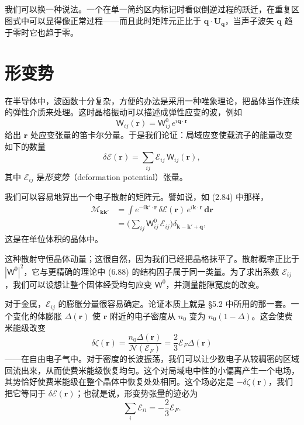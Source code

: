 我们可以换一种说法。一个在单一简约区内标记时看似倒逆过程的跃迁，在重复区图式中可以显得像正常过程——而且此时矩阵元正比于 $\mathbf{q}\cdot\mathbf{U}_{\mathbf{q}}$，当声子波矢 $\mathbf{q}$ 趋于零时它也趋于零。

\section{形变势}

在半导体中，波函数十分复杂，方便的办法是采用一种唯象理论，把晶体当作连续的弹性介质来处理。这时晶格振动可以描述成弹性应变的波，例如
\begin{equation*}
\mathsf{W}_{ij}(\mathbf{r}) = \mathsf{W}_{ij}^{0}\,e^{i\mathbf{q}\cdot\mathbf{r}} \tag{6.94}
\end{equation*}
给出 $\mathbf{r}$ 处应变张量的笛卡尔分量。于是我们论证：局域应变使载流子的能量改变如下的数量
\begin{equation*}
\delta\mathcal{E}(\mathbf{r}) = \sum_{ij}\mathcal{E}_{ij}\,\mathsf{W}_{ij}(\mathbf{r}), \tag{6.95}
\end{equation*}
其中 $\mathcal{E}_{ij}$ 是\emph{形变势}（deformation potential）张量。

我们可以容易地算出一个电子散射的矩阵元。譬如说，如 (2.84) 中那样，
\begin{align*}
\mathcal{M}_{\mathbf{k}\mathbf{k}'} &= \int e^{-i\mathbf{k}'\cdot\mathbf{r}}\,\delta\mathcal{E}(\mathbf{r})\,e^{i\mathbf{k}\cdot\mathbf{r}}\,\mathbf{dr} \\
&= \bigl(\sum_{ij}\mathsf{W}_{ij}^{0}\,\mathcal{E}_{ij}\bigr)\delta_{\mathbf{k}-\mathbf{k}'+\mathbf{q}}, \tag{6.96}
\end{align*}
这是在单位体积的晶体中。

这种散射守恒晶体动量；这很自然，因为我们已经把晶格抹平了。散射概率正比于 $|\mathsf{W}^{0}|^{2}$，它与更精确的理论中 (6.88) 的结构因子属于同一类量。为了求出系数 $\mathcal{E}_{ij}$，我们可以设想让整个固体经受均匀应变 $\mathsf{W}^{0}$，并测量能隙宽度的改变。

对于金属，$\mathcal{E}_{ij}$ 的膨胀分量很容易确定。论证本质上就是 §5.2 中所用的那一套。一个变化的体膨胀 $\Delta(\mathbf{r})$ 使 $\mathbf{r}$ 附近的电子密度从 $n_{0}$ 变为 $n_{0}(1-\Delta)$。这会使费米能级改变
\begin{equation*}
\delta\zeta(\mathbf{r}) = \frac{n_{0}\Delta(\mathbf{r})}{\mathcal{N}(\mathcal{E}_{F})} = \frac{2}{3}\mathcal{E}_{F}\Delta(\mathbf{r}) \tag{6.97}
\end{equation*}
——在自由电子气中。对于密度的长波振荡，我们可以让少数电子从较稠密的区域回流出来，从而使费米能级恢复均匀。这个对局域电中性的小偏离产生一个电场，其势恰好使费米能级在整个晶体中恢复处处相同。这个场必定是 $-\delta\zeta(\mathbf{r})$，我们把它等同于 $\delta\mathcal{E}(\mathbf{r})$；也就是说，形变势张量的迹必为
\begin{equation*}
\sum_{i}\mathcal{E}_{ii} = -\frac{2}{3}\mathcal{E}_{F}. \tag{6.98}
\end{equation*}

